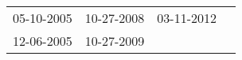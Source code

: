 \begin{supertabular}{llll}
 05-10-2005 &  10-27-2008 &  03-11-2012 \\
 12-06-2005 &  10-27-2009 &             \\
\end{supertabular}
